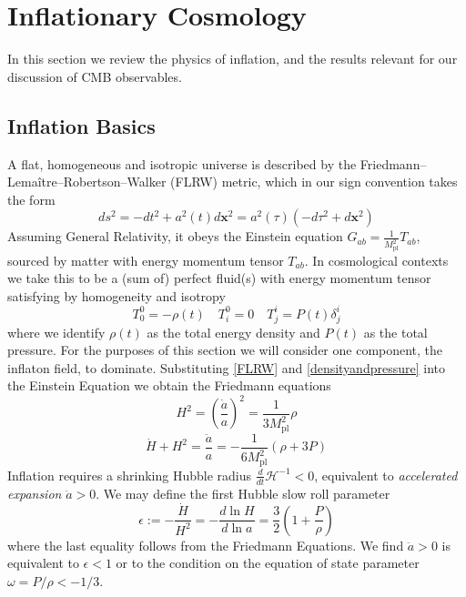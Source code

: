 \documentclass[a4paper,10pt]{article}
\renewcommand{\v}[1]{\mathbf{#1}}
\newcommand{\Mp}{M_{\text{pl}}}
\begin{document}
\newpage
\section{Inflationary Cosmology}

In this section we review the physics of inflation, and the results relevant for our discussion of CMB observables.

\subsection{Inflation Basics}
A flat, homogeneous and isotropic universe is described by the Friedmann–Lemaître–Robertson–Walker (FLRW) metric, which in our sign convention takes the form
\begin{equation}
\label{FLRW}
ds^2 = - dt^2 + a^2(t)d\v{x}^2 = a^2(\tau)(-d\tau^2+d\v{x}^2)
\end{equation}
Assuming General Relativity, it obeys the Einstein equation $G_{ab} = \frac{1}{\Mp^2} T_{ab}$, sourced by matter with energy momentum tensor $T_{ab}$. In cosmological contexts we take this to be a (sum of) perfect fluid(s) with energy momentum tensor satisfying by homogeneity and isotropy
\begin{equation}
\label{densityandpressure}
T^0_0 = - \rho(t) \quad T^0_i = 0 \quad T^i_j = P(t)\delta^i_j
\end{equation}
where we identify $\rho(t)$ as the total energy density and $P(t)$ as the total pressure. For the purposes of this section we will consider one component, the inflaton field, to dominate.  Substituting \ref{FLRW} and \ref{densityandpressure} into the Einstein Equation we obtain the Friedmann equations
\begin{equation}
H^2 = \left(\frac{\dot{a}}{a}\right)^2 = \frac{1}{3\Mp^2}\rho
\tag{F1}
\label{F1}
\end{equation}
\begin{equation}
\dot{H} + H^2 = \frac{\ddot{a}}{a} = -\frac{1}{6\Mp^2}(\rho + 3P)
\tag{F2}
\label{F2}
\end{equation}
Inflation requires a shrinking Hubble radius $\frac{d}{dt}\mathcal{H}^{-1}<0$, equivalent to \textit{accelerated expansion} $\ddot{a} >0$. We may define the first Hubble slow roll parameter 
\begin{equation}
\label{epsilon}
\epsilon := -\frac{\dot{H}}{H^2} = -\frac{d\ln{H}}{d\ln{a}} = \frac{3}{2}\left(1+\frac{P}{\rho}\right)
\end{equation}
where the last equality follows from the Friedmann Equations. We find $\ddot{a} >0$ is equivalent to $\epsilon<1$ or to the condition on the equation of state parameter $\omega=P/\rho < -1/3$.\\ 
\end{document}
